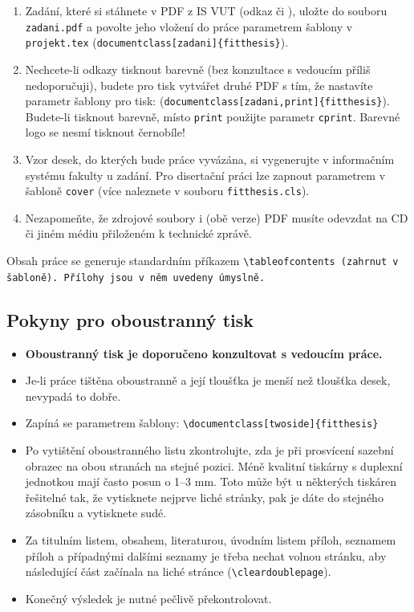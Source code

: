 \begin{enumerate}
  \item Zadání, které si stáhnete v PDF z IS VUT (odkaz  či ), uložte do souboru \texttt{zadani.pdf} a povolte jeho vložení do práce parametrem šablony v \texttt{projekt.tex} (\verb|document|\verb|class[zadani]{fitthesis}|).
  \item Nechcete-li odkazy tisknout barevně (bez konzultace s vedoucím příliš nedoporučuji), budete pro tisk vytvářet druhé PDF s tím, že nastavíte parametr šablony pro tisk: (\verb|document|\verb|class[zadani,print]{fitthesis}|). Budete-li tisknout barevně, místo \texttt{print} použijte parametr \texttt{cprint}. Barevné logo se nesmí tisknout černobíle!
  \item Vzor desek, do kterých bude práce vyvázána, si vygenerujte v informačním systému fakulty u zadání. Pro disertační práci lze zapnout parametrem v šabloně \texttt{cover} (více naleznete v souboru \texttt{fitthesis.cls}).
  \item Nezapomeňte, že zdrojové soubory i (obě verze) PDF musíte odevzdat na CD či jiném médiu přiloženém k technické zprávě.
\end{enumerate}

Obsah práce se generuje standardním příkazem \tt \textbackslash tableofcontents \rm (zahrnut v šabloně). Přílohy jsou v něm uvedeny úmyslně.

\subsection{Pokyny pro oboustranný tisk}
\begin{itemize}
\item \textbf{Oboustranný tisk je doporučeno konzultovat s vedoucím práce.}
\item Je-li práce tištěna oboustranně a její tloušťka je menší než tloušťka desek, nevypadá to dobře.
\item Zapíná se parametrem šablony: \verb|\document|\verb|class[twoside]{fitthesis}|
\item Po vytištění oboustranného listu zkontrolujte, zda je při prosvícení sazební obrazec na obou stranách na stejné pozici. Méně kvalitní tiskárny s duplexní jednotkou mají často posun o 1--3 mm. Toto může být u některých tiskáren řešitelné tak, že vytisknete nejprve liché stránky, pak je dáte do stejného zásobníku a vytisknete sudé.
\item Za titulním listem, obsahem, literaturou, úvodním listem příloh, seznamem příloh a případnými dalšími seznamy je třeba nechat volnou stránku, aby následující část začínala na liché stránce (\texttt{\textbackslash cleardoublepage}).
\item  Konečný výsledek je nutné pečlivě překontrolovat.
\end{itemize}


